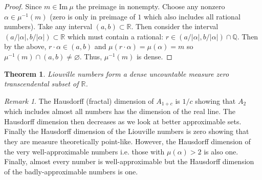 \documentclass{article}
\newcommand{\Q}{\mathbb{Q}}
\newcommand{\R}{\mathbb{R}}
\renewcommand{\Im}[1]{\mathrm{Im} \: #1}
\theoremstyle{theorem}
\newtheorem{theorem}{Theorem}[section]
\theoremstyle{definition}
\theoremstyle{definition}
\theoremstyle{remark}
\theoremstyle{definition}
\theoremstyle{remark}
\newtheorem{remark}{Remark}[subsection]
\begin{document}
\begin{proof}
Since $m \in \Im{\mu}$ the preimage in nonempty. Choose any nonzero $\alpha \in \mu^{-1}(m)$ (zero is only in preimage of $1$ which also includes all rational numbers). Take any interval $(a,b) \subset \R$. Then consider the interval $(a/|\alpha|, b/|\alpha|) \subset \R$ which must contain a rational: $r \in (a/|\alpha|, b/|\alpha|) \cap \Q$. Then by the above, $r \cdot \alpha \in (a, b)$ and $\mu(r \cdot \alpha) = \mu(\alpha) = m$ so $\mu^{-1}(m) \cap (a,b) \neq \varnothing$. Thus, $\mu^{-1}(m)$ is dense.   
\end{proof}

\begin{theorem}
Liouville numbers form a dense uncountable measure zero transcendental subset of $\R$. 
\end{theorem}

\begin{remark}
The Hausdorff (fractal) dimension of $A_{1 + c}$ is $1/c$ showing that $A_2$ which includes almost all numbers has the dimension of the real line. The Hausdorff dimension then decreases as we look at better approximable sets. Finally the Hausdorff dimension of the Liouville numbers is zero showing that they are measure theoretically point-like. However, the Hausdorff dimension of the very well-approximable numbers i.e. those with $\mu(\alpha) > 2$ is also one. Finally, almost every number is well-approximable but the Hausdorff dimension of the badly-approximable numbers is one.
\end{remark}
\end{document}
